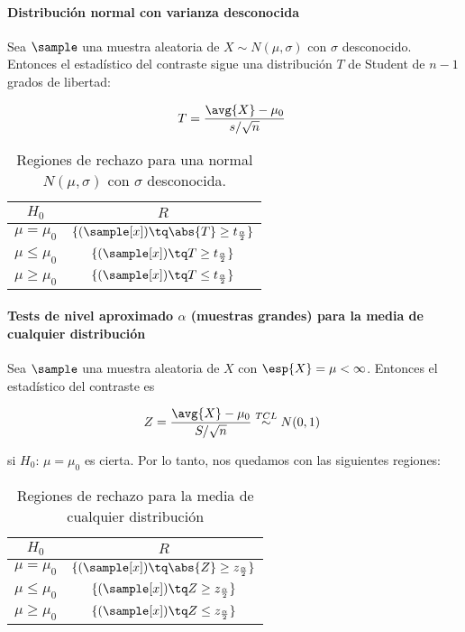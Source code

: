 \documentclass{apuntes}
\begin{document}
\paragraph{Distribución normal con varianza desconocida}

Sea $\sample$ una muestra aleatoria de $X\sim N(\mu,\sigma)$ con $\sigma$ desconocido. Entonces el estadístico del contraste sigue una distribución $T$ de Student de $n-1$ grados de libertad:

\[ T=\frac{\avg{X} - \mu_0}{s/\sqrt{n}} \]

\begin{table}[hbtp]
\centering
\begin{tabular}{|c|c|}
\hline  $H_0$ & $R$  \\
\hline  $\mu=\mu_0$ & $\{ (\sample[x]) \tq \abs{T} \geq t_{\frac{\alpha}{2}}\}$ \\
\hline  $\mu\leq\mu_0$ & $\{ (\sample[x]) \tq T \geq t_{\frac{\alpha}{2}}\}$ \\
\hline  $\mu\geq\mu_0$ & $\{  (\sample[x]) \tq T \leq t_{\frac{\alpha}{2}}\}$ \\
\hline
\end{tabular}
\caption{Regiones de rechazo para una normal $N(\mu,\sigma)$ con $\sigma$ desconocida.}
\end{table}

\pagebreak
\paragraph{Tests de nivel aproximado $\alpha$ (muestras grandes) para la media de cualquier distribución}

 Sea $\sample$ una muestra aleatoria de $X$ con $\esp{X} = \mu < \infty$. Entonces el estadístico del contraste es

 \[ Z= \frac{\avg{X}-\mu_0}{S/\sqrt{n}}\stackrel{TCL}{\sim} N(0,1) \]

 si $H_0:\, \mu=\mu_0$ es cierta. Por lo tanto, nos quedamos con las siguientes regiones:

\begin{table}[hbtp]
\centering
\begin{tabular}{|c|c|}
\hline  $H_0$ & $R$  \\
\hline  $\mu=\mu_0$ & $\{ (\sample[x]) \tq \abs{Z} \geq z_{\frac{\alpha}{2}}\}$ \\
\hline  $\mu\leq\mu_0$ & $\{ (\sample[x]) \tq Z \geq z_{\frac{\alpha}{2}}\}$ \\
\hline  $\mu\geq\mu_0$ & $\{  (\sample[x]) \tq Z \leq z_{\frac{\alpha}{2}}\}$ \\
\hline
\end{tabular}
\caption{Regiones de rechazo para la media de cualquier distribución}
\end{table}
\end{document}
